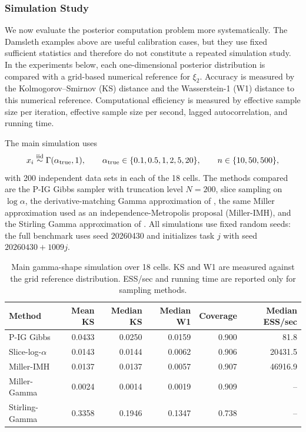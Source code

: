 
\subsubsection{Simulation Study}
\label{subsec:gamma-shape-simulation}

We now evaluate the posterior computation problem more systematically.  The
Damsleth examples above are useful calibration cases, but they use fixed
sufficient statistics and therefore do not constitute a repeated simulation
study.  In the experiments below, each one-dimensional posterior distribution
is compared with a grid-based numerical reference for $\xi_2$.  Accuracy is
measured by the Kolmogorov--Smirnov (KS) distance and the Wasserstein-1 (W1)
distance to this numerical reference.  Computational efficiency is measured by
effective sample size per iteration, effective sample size per second, lagged
autocorrelation, and running time.

The main simulation uses
\[
        x_i \stackrel{\rm iid}{\sim} \Gamma(\alpha_{\rm true},1),
        \qquad
        \alpha_{\rm true}\in\{0.1,0.5,1,2,5,20\},
        \qquad
        n\in\{10,50,500\},
\]
with 200 independent data sets in each of the 18 cells.  The methods compared
are the P-IG Gibbs sampler with truncation level $N=200$, slice sampling on
$\log\alpha$, the derivative-matching Gamma approximation of
\cite*{miller2019fast}, the same Miller approximation used as an
independence-Metropolis proposal (Miller-IMH), and the Stirling Gamma
approximation of \cite*{rossell2009gaga}.  All simulations use fixed random
seeds: the full benchmark uses seed 20260430 and initializes task $j$ with
seed $20260430+1009j$.

\begin{table}[t]
        \centering
        \small
        \caption{Main gamma-shape simulation over 18 cells.  KS and W1 are
        measured against the grid reference distribution.  ESS/sec and running
        time are reported only for sampling methods.}
        \label{tab:gamma-shape-main}
        \begin{tabular}{@{}lrrrrr@{}}
                \toprule
                Method & Mean KS & Median KS & Median W1 & Coverage & Median ESS/sec \\
                \midrule
                P-IG Gibbs       & 0.0433 & 0.0250 & 0.0159 & 0.900 & 81.8 \\
                Slice-log-$\alpha$ & 0.0143 & 0.0144 & 0.0062 & 0.906 & 20431.5 \\
                Miller-IMH       & 0.0137 & 0.0137 & 0.0057 & 0.907 & 46916.9 \\
                Miller-Gamma     & 0.0024 & 0.0014 & 0.0019 & 0.909 & -- \\
                Stirling-Gamma   & 0.3358 & 0.1946 & 0.1347 & 0.738 & -- \\
                \bottomrule
        \end{tabular}
\end{table}

